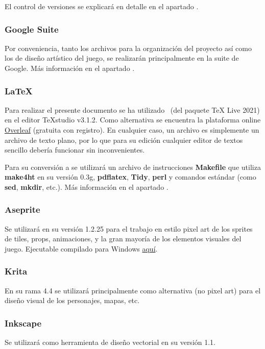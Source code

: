 El control de versiones se explicará en detalle en el apartado .

\subsubsection{Google Suite}
Por conveniencia, tanto los archivos para la organización del proyecto así como
los de diseño artístico del juego, se realizarán principalmente en la suite de
Google. Más información en el apartado .

\subsubsection{LaTeX}
Para realizar el presente documento se ha utilizado \LaTeXe\ (del paquete TeX
Live 2021) en el editor TeXstudio v3.1.2. Como alternativa se encuentra la
plataforma online \href{https://www.overleaf.com/}{Overleaf} (gratuita con
registro). En cualquier caso, un archivo  es simplemente un archivo de
texto plano, por lo que para su edición cualquier editor de textos sencillo
debería funcionar sin inconvenientes.

Para su conversión a  se utilizará un archivo de instrucciones
\textbf{Makefile} que utiliza \textbf{make4ht} en su versión 0.3g,
\textbf{pdflatex}, \textbf{Tidy}, \textbf{perl} y comandos  estándar
(como \textbf{sed}, \textbf{mkdir}, etc.). Más información en el apartado
.

\subsubsection{Aseprite}
Se utilizará en su versión 1.2.25 para el trabajo en estilo pixel art de los sprites de tiles, props, animaciones,  y la gran mayoría de los elementos visuales del juego. Ejecutable compilado para Windows \href{https://drive.google.com/drive/folders/1DPhGeg7WzV9j81u3B5isgsXqoMtfd_Uv?usp=sharing}{aquí}.

\subsubsection{Krita}
En su rama 4.4 se utilizará principalmente como alternativa (no pixel art) para el diseño visual de los personajes, mapas, etc.

\subsubsection{Inkscape}
Se utilizará como herramienta de diseño vectorial en su versión 1.1.

